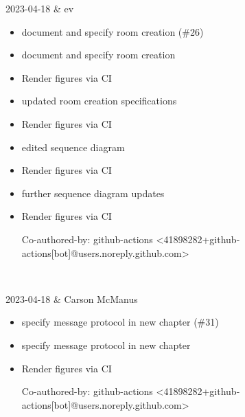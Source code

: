 2023-04-18 & ev
\begin{itemize}[topsep=0pt,itemsep=0pt,parsep=0pt,partopsep=0pt,leftmargin=12pt]
\item document and specify room creation (\#26)

\item document and specify room creation

\item Render figures via CI

\item updated room creation specifications

\item Render figures via CI

\item edited sequence diagram

\item Render figures via CI

\item further sequence diagram updates

\item Render figures via CI



Co-authored-by: github-actions <41898282+github-actions[bot]@users.noreply.github.com>
\end{itemize}
\\ \hline

2023-04-18 & Carson McManus
\begin{itemize}[topsep=0pt,itemsep=0pt,parsep=0pt,partopsep=0pt,leftmargin=12pt]
\item specify message protocol in new chapter (\#31)

\item specify message protocol in new chapter

\item Render figures via CI



Co-authored-by: github-actions <41898282+github-actions[bot]@users.noreply.github.com>
\end{itemize}
\\ \hline

